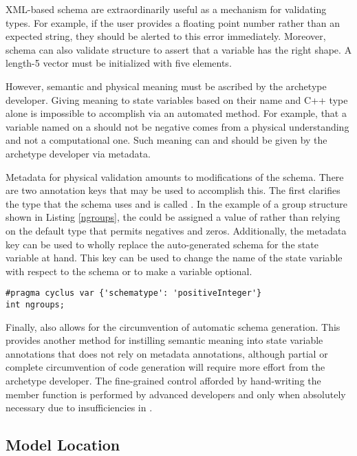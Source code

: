 \gls{XML}-based schema are extraordinarily useful as a mechanism for validating types. 
For example, if the user provides a floating point number rather than an 
expected string, they should be alerted to this error immediately.
Moreover, schema can also validate structure to assert that 
a variable has the right shape. A length-5 vector must be initialized with 
five elements. 

However, semantic and physical meaning must be ascribed by the archetype developer.
Giving meaning to state variables based
on their name and C++ type alone is impossible to accomplish via an automated
method. For example, that a variable named  
on a  should not be negative comes from a physical understanding
and not a computational one. Such meaning can and should be given by the 
archetype developer via metadata.

Metadata for physical validation amounts to modifications of the schema. There are 
two annotation keys that may be used to accomplish this.  The first clarifies the 
type that the schema uses and is called .  
In the example of a group structure shown in Listing \ref{ngroups}, the 
 could be assigned a value of 
 rather than relying on the default  type
that permits negatives and zeros. Additionally, the metadata key 
can be used to wholly replace the auto-generated schema for the state variable at 
hand. This key can be used to change the name of the state variable with respect 
to the schema or to make a variable optional.

\begin{lstlisting}[caption={Physical Constraint Addition via `schematype'}, label=ngroups]
#pragma cyclus var {'schematype': 'positiveInteger'}
int ngroups;
\end{lstlisting}

Finally, \Cyclus also allows for the circumvention of automatic schema generation. This 
provides another method for instilling semantic meaning into state variable annotations
that does not rely on metadata annotations, although
partial or complete circumvention of code generation will require
more effort from the archetype developer. The fine-grained control afforded by 
hand-writing the  member function is performed 
by advanced developers and only when absolutely necessary due to insufficiencies 
in \cycpp.

\subsection{Model Location}

